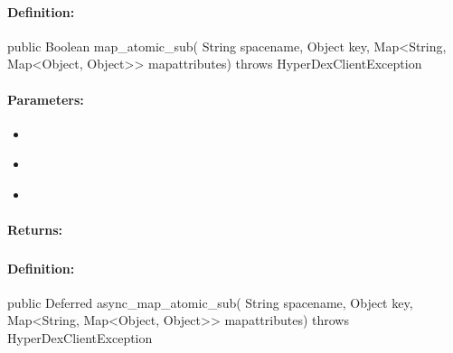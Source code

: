 \paragraph{Definition:}
\begin{javacode}
public Boolean map_atomic_sub(
        String spacename,
        Object key,
        Map<String, Map<Object, Object>> mapattributes) throws HyperDexClientException
\end{javacode}

\paragraph{Parameters:}
\begin{itemize}[noitemsep]
\item {}\\

\item {}\\

\item {}\\

\end{itemize}

\paragraph{Returns:}


\pagebreak
\subsubsection{}
\label{api:java:async_map_atomic_sub}


\paragraph{Definition:}
\begin{javacode}
public Deferred async_map_atomic_sub(
        String spacename,
        Object key,
        Map<String, Map<Object, Object>> mapattributes) throws HyperDexClientException
\end{javacode}

